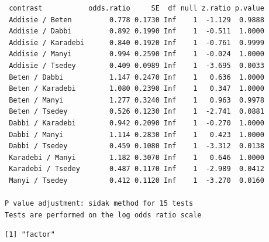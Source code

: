 \documentclass[
  letterpaper,
  DIV=11,
  numbers=noendperiod]{scrartcl}
\newenvironment{Shaded}{\begin{snugshade}}{\end{snugshade}}
\newcommand{\AttributeTok}[1]{\textcolor[rgb]{0.40,0.45,0.13}{#1}}
\newcommand{\CommentTok}[1]{\textcolor[rgb]{0.37,0.37,0.37}{#1}}
\newcommand{\FloatTok}[1]{\textcolor[rgb]{0.68,0.00,0.00}{#1}}
\newcommand{\FunctionTok}[1]{\textcolor[rgb]{0.28,0.35,0.67}{#1}}
\newcommand{\NormalTok}[1]{\textcolor[rgb]{0.00,0.23,0.31}{#1}}
\newcommand{\OtherTok}[1]{\textcolor[rgb]{0.00,0.23,0.31}{#1}}
\newcommand{\SpecialCharTok}[1]{\textcolor[rgb]{0.37,0.37,0.37}{#1}}
\newcommand{\StringTok}[1]{\textcolor[rgb]{0.13,0.47,0.30}{#1}}
\begin{document}
\begin{verbatim}
 contrast           odds.ratio     SE  df null z.ratio p.value
 Addisie / Beten         0.778 0.1730 Inf    1  -1.129  0.9888
 Addisie / Dabbi         0.892 0.1990 Inf    1  -0.511  1.0000
 Addisie / Karadebi      0.840 0.1920 Inf    1  -0.761  0.9999
 Addisie / Manyi         0.994 0.2590 Inf    1  -0.024  1.0000
 Addisie / Tsedey        0.409 0.0989 Inf    1  -3.695  0.0033
 Beten / Dabbi           1.147 0.2470 Inf    1   0.636  1.0000
 Beten / Karadebi        1.080 0.2390 Inf    1   0.347  1.0000
 Beten / Manyi           1.277 0.3240 Inf    1   0.963  0.9978
 Beten / Tsedey          0.526 0.1230 Inf    1  -2.741  0.0881
 Dabbi / Karadebi        0.942 0.2090 Inf    1  -0.270  1.0000
 Dabbi / Manyi           1.114 0.2830 Inf    1   0.423  1.0000
 Dabbi / Tsedey          0.459 0.1080 Inf    1  -3.312  0.0138
 Karadebi / Manyi        1.182 0.3070 Inf    1   0.646  1.0000
 Karadebi / Tsedey       0.487 0.1170 Inf    1  -2.989  0.0412
 Manyi / Tsedey          0.412 0.1120 Inf    1  -3.270  0.0160

P value adjustment: sidak method for 15 tests 
Tests are performed on the log odds ratio scale 
\end{verbatim}

\begin{Shaded}
\end{Shaded}

\begin{verbatim}
[1] "factor"
\end{verbatim}

\begin{Shaded}
\end{Shaded}
\end{document}
